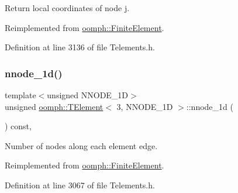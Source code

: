 Return local coordinates of node j. 



Reimplemented from \hyperlink{classoomph_1_1FiniteElement_a22bc4ee35e4f948d8d7fba18c7b4f4c4}{oomph\+::\+Finite\+Element}.



Definition at line 3136 of file Telements.\+h.

\mbox{\label{classoomph_1_1TElement_3_013_00_01NNODE__1D_01_4_a28542ccab4d95227085de22683238696}} 
\subsubsection{\texorpdfstring{nnode\+\_\+1d()}{nnode\_1d()}}
{\footnotesize\ttfamily template$<$unsigned N\+N\+O\+D\+E\+\_\+1D$>$ \\
unsigned \hyperlink{classoomph_1_1TElement}{oomph\+::\+T\+Element}$<$ 3, N\+N\+O\+D\+E\+\_\+1D $>$\+::nnode\+\_\+1d (\begin{DoxyParamCaption}{ }\end{DoxyParamCaption}) const\hspace{0.3cm}{\ttfamily [inline]}, {\ttfamily [virtual]}}



Number of nodes along each element edge. 



Reimplemented from \hyperlink{classoomph_1_1FiniteElement_ab65c7a94dda80c1876a09ac12be4e39c}{oomph\+::\+Finite\+Element}.



Definition at line 3067 of file Telements.\+h.

\mbox{\label{classoomph_1_1TElement_3_013_00_01NNODE__1D_01_4_aa9431fb359bcf4ac23ce94f0142b8353}} 
